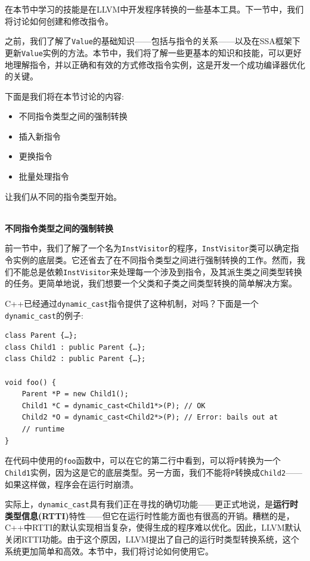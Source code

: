 在本节中学习的技能是在LLVM中开发程序转换的一些基本工具。下一节中，我们将讨论如何创建和修改指令。


之前，我们了解了\texttt{Value}的基础知识——包括与指令的关系——以及在SSA框架下更新\texttt{Value}实例的方法。本节中，我们将了解一些更基本的知识和技能，可以更好地理解指令，并以正确和有效的方式修改指令实例，这是开发一个成功编译器优化的关键。

下面是我们将在本节讨论的内容:

\begin{itemize}
\item 不同指令类型之间的强制转换
\item 插入新指令
\item 更换指令
\item 批量处理指令
\end{itemize}

让我们从不同的指令类型开始。

\hspace*{\fill} \\ %
\noindent
\textbf{不同指令类型之间的强制转换}

前一节中，我们了解了一个名为\texttt{InstVisitor}的程序，\texttt{InstVisitor}类可以确定指令实例的底层类。它还省去了在不同指令类型之间进行强制转换的工作。然而，我们不能总是依赖\texttt{InstVisitor}来处理每一个涉及到指令，及其派生类之间类型转换的任务。更简单地说，我们想要一个父类和子类之间类型转换的简单解决方案。

C++已经通过\texttt{dynamic\_cast}指令提供了这种机制，对吗？下面是一个\texttt{dynamic\_cast}的例子:

\begin{lstlisting}[style=styleCXX]
class Parent {…};
class Child1 : public Parent {…};
class Child2 : public Parent {…};

void foo() {
	Parent *P = new Child1();
	Child1 *C = dynamic_cast<Child1*>(P); // OK
	Child2 *O = dynamic_cast<Child2*>(P); // Error: bails out at
	// runtime
}
\end{lstlisting}

在代码中使用的\texttt{foo}函数中，可以在它的第二行中看到，可以将\texttt{P}转换为一个\texttt{Child1}实例，因为这是它的底层类型。另一方面，我们不能将\texttt{P}转换成\texttt{Child2}——如果这样做，程序会在运行时崩溃。

实际上，\texttt{dynamic\_cast}具有我们正在寻找的确切功能——更正式地说，是\textbf{运行时类型信息(RTTI)}特性——但它在运行时性能方面也有很高的开销。糟糕的是，C++中RTTI的默认实现相当复杂，使得生成的程序难以优化。因此，LLVM默认关闭RTTI功能。由于这个原因，LLVM提出了自己的运行时类型转换系统，这个系统更加简单和高效。本节中，我们将讨论如何使用它。

